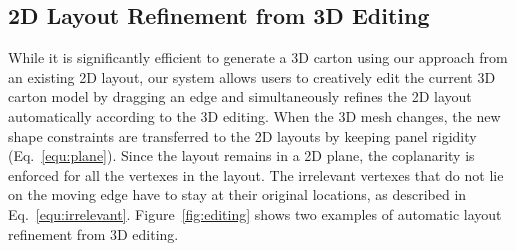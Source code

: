 

\subsection{2D Layout Refinement from 3D Editing}

While it is significantly efficient to generate a 3D carton using our approach from an existing 2D layout, our system allows users to creatively edit the current 3D carton model by dragging an edge and simultaneously refines the 2D layout automatically according to the 3D editing.
%
When the 3D mesh changes, the new shape constraints are transferred to the 2D layouts by keeping panel rigidity (Eq.~\ref{equ:plane}).
Since the layout remains in a 2D plane, the coplanarity is enforced for all the vertexes in the layout. 
%
% 
The irrelevant vertexes that do not lie on the moving edge have to stay at their original locations, as described in Eq.~\ref{equ:irrelevant}.
Figure~\ref{fig:editing} shows two examples of automatic layout refinement from 3D editing.                                                                     

